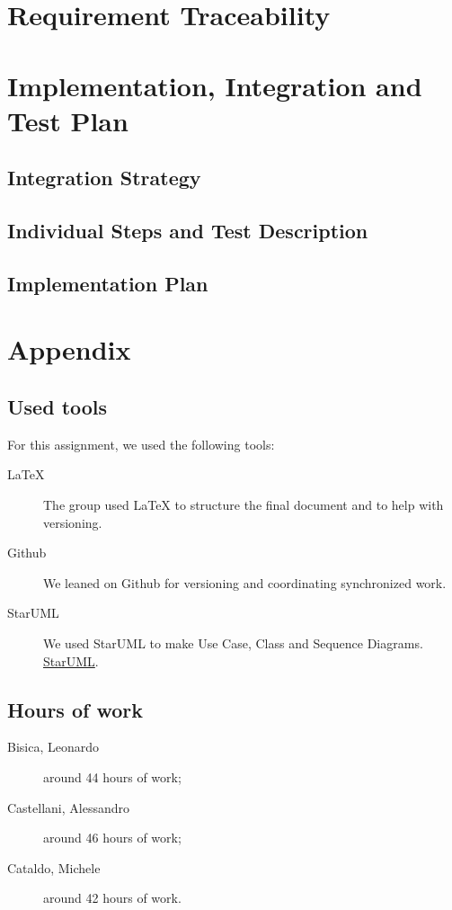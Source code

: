 \documentclass[12pt, a4paper]{article}
\begin{document}
		
	\section{Requirement Traceability}
		

	\newpage
	\section{Implementation, Integration and Test Plan}
		
		\subsection{Integration Strategy}
			
			
		\subsection{Individual Steps and Test Description}
			
			
		\subsection{Implementation Plan}
			

	\newpage	
	\section{Appendix}
		\listoffigures
		\listofalgorithms
		
		\subsection{Used tools}
		For this assignment, we used the following tools:
		
		\begin{description}
			\item [LaTeX] The group used LaTeX to structure the final document and to help with versioning.
			\item [Github] We leaned on Github for versioning and coordinating synchronized work.
			\item[StarUML] We used StarUML  to make Use Case, Class and Sequence Diagrams. \href{http://staruml.io/}{StarUML}.
			
		\end{description}
		
		\subsection{Hours of work}
			\begin{description}
				\item[Bisica, Leonardo] around 44 hours of work;
				\item[Castellani, Alessandro] around 46 hours of work;
				\item[Cataldo, Michele] around 42 hours of work.
			\end{description}
			
\end{document}
